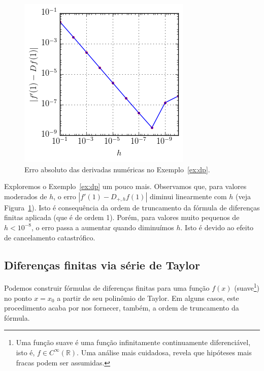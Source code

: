 \begin{figure}
  \centering
  \includegraphics{./cap_derivacao/pics/ex_derivacao/ex_derivacao}
  \caption{Erro absoluto das derivadas numéricas no Exemplo~\ref{ex:dp}.}
  \label{fig:ex_derivacao}
\end{figure}

Exploremos o Exemplo~\ref{ex:dp} um pouco mais. Observamos que, para valores moderados de $h$, o erro $|f'(1)-D_{+,h}f(1)|$ diminui linearmente com $h$ (veja Figura~\ref{fig:ex_derivacao}). Isto é consequência da ordem de truncamento da fórmula de diferenças finitas aplicada (que é de ordem 1). Porém, para valores muito pequenos de $h < 10^{-8}$, o erro passa a aumentar quando diminuímos $h$. Isto é devido ao efeito de cancelamento catastrófico.

\subsection{Diferenças finitas via série de Taylor}

Podemos construir fórmulas de diferenças finitas para uma função $f(x)$ (suave\footnote{Uma função suave é uma função infinitamente continuamente diferenciável, isto é, $f\in C^\infty(\mathbb{R})$. Uma análise mais cuidadosa, revela que hipóteses mais fracas podem ser assumidas.}) no ponto $x = x_0$ a partir de seu polinômio de Taylor. Em alguns casos, este procedimento acaba por nos fornecer, também, a ordem de truncamento da fórmula.

